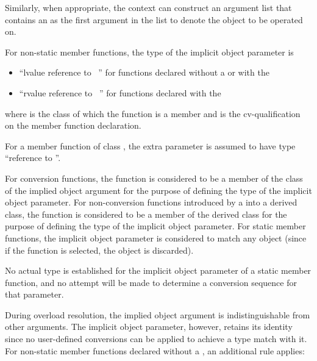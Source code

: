 \pnum
Similarly, when appropriate, the context can construct an
argument list that contains an
as the first argument in the list to denote
the object to be operated on.

\pnum
For non-static member functions, the type of the implicit object
parameter is

\begin{itemize}
\item ``lvalue reference to \cv{}~'' for functions declared
without a  or with the
\tcode{\&} 
\item ``rvalue reference to \cv{}~'' for functions declared with the
\tcode{\&\&} 
\end{itemize}

where
is the class of which the function is a member and
\cv{}
is the cv-qualification on the
member function declaration.
\begin{example}
For a
member
function of class
,
the extra parameter is assumed to have type
``reference to
''.
\end{example}
For conversion functions, the function is considered to be a member of the
class of the implied object argument for the purpose of defining the
type of the implicit object parameter.
For non-conversion functions
introduced by a
into a derived class, the function is
considered to be a member of the derived class for the purpose of defining
the type of the implicit object parameter.
For static member functions, the implicit object parameter is considered
to match any object (since if the function is selected, the object is
discarded).
\begin{note}
No actual type is established for the implicit object parameter
of a static member function, and no attempt will be made to determine a
conversion sequence for that parameter.
\end{note}

\pnum
{}%
During overload resolution, the implied object argument is
indistinguishable from other arguments.
The implicit object
parameter, however, retains its identity since
no user-defined conversions can be applied to achieve a type
match with it.
%
For non-static member functions declared without a ,
an additional rule applies:

